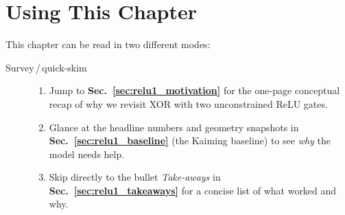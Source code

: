 \section{Using This Chapter}
\label{sec:relu1_using}

This chapter can be read in two different modes:

\begin{description}
  \item[Survey\,/\,quick-skim]
        \begin{enumerate}
          \item Jump to \textbf{Sec.~\ref{sec:relu1_motivation}} for the one-page conceptual recap of why we revisit XOR with two unconstrained ReLU gates.
          \item Glance at the headline numbers and geometry snapshots in \textbf{Sec.~\ref{sec:relu1_baseline}} (the Kaiming baseline) to see \emph{why} the model needs help.
          \item Skip directly to the bullet \emph{Take-aways} in \textbf{Sec.~\ref{sec:relu1_takeaways}} for a concise list of what worked and why.
        \end{enumerate}


\end{description}
